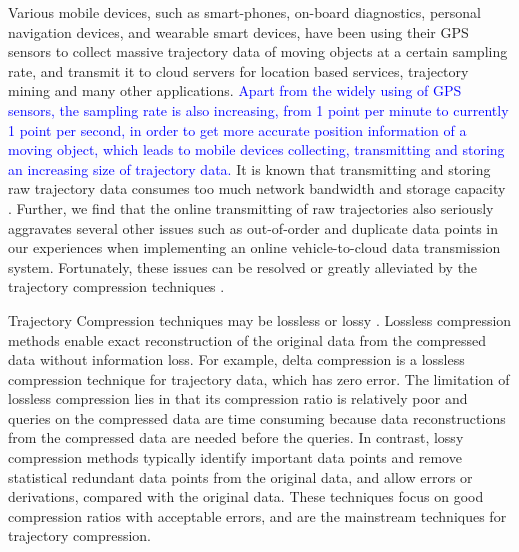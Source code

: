 Various mobile devices, such as smart-phones, on-board diagnostics, personal navigation devices, and wearable smart devices, have been using their GPS sensors to collect massive trajectory data of moving objects at a certain sampling rate, and transmit it to cloud servers for location based services, trajectory mining and many other applications.
\textcolor{blue}{Apart from the widely using of GPS sensors, the sampling rate is also increasing, \eg from 1 point per minute to currently 1 point per second, in order to get more accurate position information of a moving object, which leads to mobile devices collecting, transmitting and storing an increasing size of trajectory data.}
%
It is known that transmitting and storing raw trajectory data consumes too much network bandwidth and storage capacity \cite{Chen:Trajectory,  Chen:Fast, Meratnia:Spatiotemporal, Keogh:online, Liu:BQS, Muckell:Compression,Cao:Spatio, Popa:Spatio, Schmid:Semantic,Richter:Semantic,Long:Direction,Nibali:Trajic}.
Further, we find that the online transmitting of raw trajectories also seriously aggravates several other issues such as out-of-order and duplicate data points in our experiences when implementing an online vehicle-to-cloud data transmission system.
Fortunately, these issues can be resolved or greatly alleviated by the trajectory compression techniques \cite{Douglas:Peucker, Hershberger:Speeding, Meratnia:Spatiotemporal, Liu:BQS, Muckell:Compression, Chen:Trajectory, Chen:Fast, Keogh:online, Cao:Spatio, Shi:Survey, Richter:Semantic ,Long:Direction, Song:PRESS, Nibali:Trajic}.

Trajectory Compression techniques may be lossless or lossy \cite{Muckell:Compression}.
%
Lossless compression methods enable exact reconstruction of the original data from the compressed data without information loss. For example, delta compression \cite{Nibali:Trajic} is a lossless compression technique for trajectory data, which has zero error.
The limitation of lossless compression lies in that its compression ratio is relatively poor \cite{Nibali:Trajic} and {queries on the compressed data are time consuming because data reconstructions from the compressed data are needed before the queries}.
%
In contrast, lossy compression methods typically identify important data points and remove statistical redundant data points from the original data, and allow errors or derivations, compared with the original data. 
These techniques focus on good compression ratios with acceptable errors, and are the mainstream techniques for trajectory compression.

